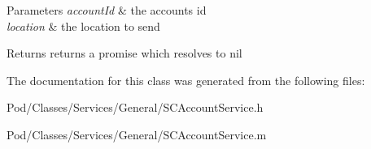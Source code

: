 \begin{DoxyParams}{Parameters}
{\em account\+Id} & the account\textquotesingle{}s id \\
\hline
{\em location} & the location to send\\
\hline
\end{DoxyParams}
\begin{DoxyReturn}{Returns}
returns a promise which resolves to nil 
\end{DoxyReturn}


The documentation for this class was generated from the following files\+:\begin{DoxyCompactItemize}
\item 
Pod/\+Classes/\+Services/\+General/S\+C\+Account\+Service.\+h\item 
Pod/\+Classes/\+Services/\+General/S\+C\+Account\+Service.\+m\end{DoxyCompactItemize}
